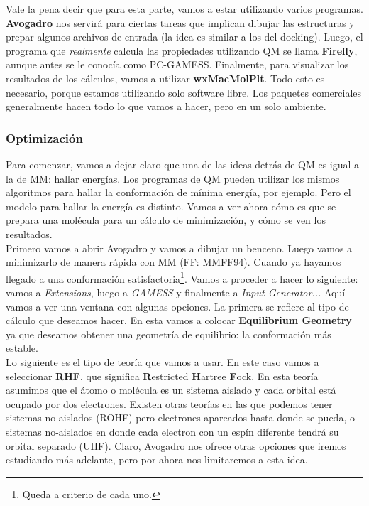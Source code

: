 \documentclass[10pt,letterpaper]{article}
\begin{document}
Vale la pena decir que para esta parte, vamos a estar utilizando varios programas. \textbf{Avogadro} nos servir\'a para ciertas tareas que implican dibujar las estructuras y prepar algunos archivos de entrada (la idea es similar a los del docking). Luego, el programa que \emph{realmente} calcula las propiedades utilizando QM se llama \textbf{Firefly}, aunque antes se le conoc\'ia como PC-GAMESS. Finalmente, para visualizar los resultados de los c\'alculos, vamos a utilizar \textbf{wxMacMolPlt}. Todo esto es necesario, porque estamos utilizando solo software libre. Los paquetes comerciales generalmente hacen todo lo que vamos a hacer, pero en un solo ambiente.

\subsubsection{Optimizaci\'on}
Para comenzar, vamos a dejar claro que una de las ideas detr\'as de QM es igual a la de MM: hallar energ\'ias. Los programas de QM pueden utilizar los mismos algoritmos para hallar la conformaci\'on de m\'inima energ\'ia, por ejemplo. Pero el modelo para hallar la energ\'ia es distinto. Vamos a ver ahora c\'omo es que se prepara una mol\'ecula para un c\'alculo de minimizaci\'on, y c\'omo se ven los resultados.\\

Primero vamos a abrir Avogadro y vamos a dibujar un benceno. Luego vamos a minimizarlo de manera r\'apida con MM (FF: MMFF94). Cuando ya hayamos llegado a una conformaci\'on satisfactoria\footnote{Queda a criterio de cada uno.}. Vamos a proceder a hacer lo siguiente: vamos a \emph{Extensions}, luego a \emph{GAMESS} y finalmente a \emph{Input Generator...} Aqu\'i vamos a ver una ventana con algunas opciones. La primera se refiere al tipo de c\'alculo que deseamos hacer. En esta vamos a colocar \textbf{Equilibrium Geometry} ya que deseamos obtener una geometr\'ia de equilibrio: la conformaci\'on m\'as estable.\\

Lo siguiente es el tipo de teor\'ia que vamos a usar. En este caso vamos a seleccionar \textbf{RHF}, que significa \textbf{R}estricted \textbf{H}artree \textbf{F}ock. En esta teor\'ia asumimos que el \'atomo o mol\'ecula es un sistema aislado y cada orbital est\'a ocupado por dos electrones. Existen otras teor\'ias en las que podemos tener sistemas no-aislados (ROHF) pero electrones apareados hasta donde se pueda, o sistemas no-aislados en donde cada electron con un esp\'in diferente tendr\'a su orbital separado (UHF). Claro, Avogadro nos ofrece otras opciones que iremos estudiando m\'as adelante, pero por ahora nos limitaremos a esta idea.\\
\end{document}
